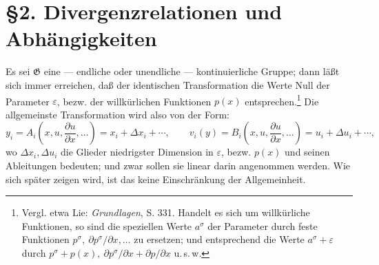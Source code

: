 \documentclass[11pt]{article}
\newcommand{\G}{\mathfrak G}
\newcommand{\D}{\Delta}
\newcommand{\eps}{\varepsilon}
\newcommand{\p}{\partial}
\begin{document}
\section*{\S{}2. Divergenzrelationen und Abhängigkeiten}

Es sei \(\G\) eine --- endliche oder unendliche --- kontinuierliche Gruppe; dann läßt sich immer erreichen, daß der identischen Transformation die Werte Null der Parameter \(\eps\), bezw. der willkürlichen Funktionen \(p(x)\) entsprechen.\footnote{Vergl. etwa Lie: \emph{Grundlagen}, S. 331. Handelt es sich um willkürliche Funktionen, so sind die speziellen Werte \(a^\sigma\) der Parameter durch feste Funktionen \(p^\sigma,\ \p p^\sigma/\p x,\ldots\) zu ersetzen; und entsprechend die Werte \(a^\sigma+\eps\) durch \(p^\sigma+p(x),\ \p p^\sigma/\p x+\p p/\p x\) u.\,s.\,w.} Die allgemeinste Transformation wird also von der Form:
\[
y_i=A_i\!\left(x,u,\frac{\p u}{\p x},\ldots\right)=x_i+\D x_i+\cdots,\qquad
v_i(y)=B_i\!\left(x,u,\frac{\p u}{\p x},\ldots\right)=u_i+\D u_i+\cdots,
\]
wo \(\D x_i,\D u_i\) die Glieder niedrigster Dimension in \(\eps\), bezw. \(p(x)\) und seinen Ableitungen bedeuten; und zwar sollen sie linear darin angenommen werden. Wie sich später zeigen wird, ist das keine Einschränkung der Allgemeinheit.
\end{document}

